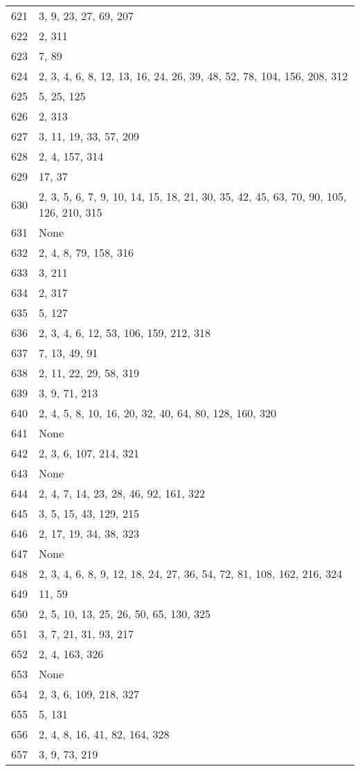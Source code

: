 \documentclass[12pt]{article}
\begin{document}
\begin{tabular}{|r|l|}
621 & 3, 9, 23, 27, 69, 207 \\ 
622 & 2, 311 \\ 
623 & 7, 89 \\ 
624 & 2, 3, 4, 6, 8, 12, 13, 16, 24, 26,  39, 48, 52, 78, 104, 156, 208, 312 \\ 
625 & 5, 25, 125 \\ 
626 & 2, 313 \\ 
627 & 3,  11, 19, 33, 57, 209 \\ 
628 & 2, 4, 157, 314 \\ 
629 & 17, 37 \\ 
630 & 2, 3, 5, 6, 7, 9, 10, 14, 15, 18, 21, 30, 35,  42, 45, 63, 70, 90, 105, 126, 210, 315 \\ 
631 & None \\ 
632 & 2, 4, 8, 79, 158, 316 \\ 
633 & 3, 211 \\ 
634 & 2, 317 \\ 
635 & 5, 127 \\ 
636 & 2, 3, 4, 6, 12, 53, 106, 159, 212, 318 \\ 
637 & 7, 13, 49, 91 \\ 
638 & 2, 11, 22, 29, 58, 319 \\ 
639 & 3, 9, 71, 213 \\ 
640 & 2, 4, 5, 8, 10, 16, 20, 32, 40, 64, 80, 128, 160, 320 \\ 
641 & None \\ 
642 & 2, 3, 6, 107, 214, 321 \\ 
643 & None \\ 
644 & 2, 4, 7, 14, 23, 28, 46, 92, 161, 322 \\ 
645 & 3, 5, 15, 43, 129, 215 \\ 
646 & 2, 17, 19, 34, 38, 323 \\ 
647 & None \\ 
648 & 2, 3, 4,  6, 8, 9, 12, 18, 24, 27, 36, 54, 72, 81, 108, 162, 216, 324 \\ 
649 & 11, 59 \\ 
650 & 2, 5, 10, 13, 25, 26, 50, 65, 130, 325 \\ 
651 & 3, 7, 21, 31, 93, 217 \\ 
652 & 2, 4, 163, 326 \\ 
653 & None \\ 
654 & 2, 3, 6, 109, 218, 327 \\ 
655 & 5, 131 \\ 
656 & 2, 4, 8, 16, 41, 82, 164, 328 \\ 
657 & 3, 9, 73, 219 \\ 

\end{tabular}
\end{document}

